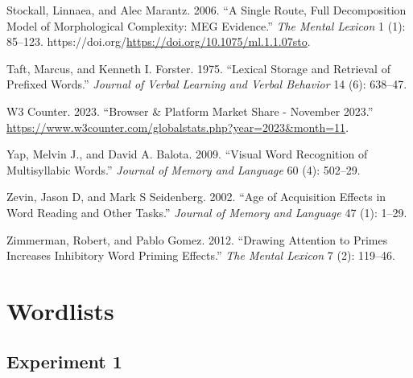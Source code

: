 \documentclass[
]{interact}
\newlength{\cslhangindent}
\newenvironment{CSLReferences}[2] %
 {\begin{list}{}{%
  \setlength{\itemindent}{0pt}
  \setlength{\leftmargin}{0pt}
  \setlength{\parsep}{0pt}
  \ifodd #1
   \setlength{\leftmargin}{\cslhangindent}
   \setlength{\itemindent}{-1\cslhangindent}
  \fi
  \setlength{\itemsep}{#2\baselineskip}}}
 {\end{list}}
\begin{document}
\begin{CSLReferences}{1}{0}
Stockall, Linnaea, and Alec Marantz. 2006. {``A Single Route, Full
Decomposition Model of Morphological Complexity: MEG Evidence.''}
\emph{The Mental Lexicon} 1 (1): 85--123.
https://doi.org/\url{https://doi.org/10.1075/ml.1.1.07sto}.

Taft, Marcus, and Kenneth I. Forster. 1975. {``Lexical Storage and
Retrieval of Prefixed Words.''} \emph{Journal of Verbal Learning and
Verbal Behavior} 14 (6): 638--47.

W3 Counter. 2023. {``Browser \& Platform Market Share - November
2023.''}
\url{https://www.w3counter.com/globalstats.php?year=2023&month=11}.

Yap, Melvin J., and David A. Balota. 2009. {``Visual Word Recognition of
Multisyllabic Words.''} \emph{Journal of Memory and Language} 60 (4):
502--29.

Zevin, Jason D, and Mark S Seidenberg. 2002. {``Age of Acquisition
Effects in Word Reading and Other Tasks.''} \emph{Journal of Memory and
Language} 47 (1): 1--29.

Zimmerman, Robert, and Pablo Gomez. 2012. {``Drawing Attention to Primes
Increases Inhibitory Word Priming Effects.''} \emph{The Mental Lexicon}
7 (2): 119--46.

\end{CSLReferences}

\newpage{}

\section*{Wordlists}\label{wordlists}

\subsection*{Experiment 1}\label{experiment-1}
\end{document}
